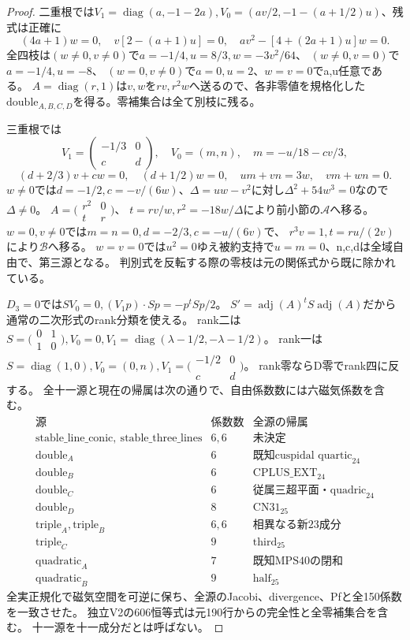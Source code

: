 \documentclass[a4paper,11pt]{ltjsarticle}
\theoremstyle{definition}
\begin{document}
\begin{proof}
二重根では$V_1=\operatorname{diag}(a,-1-2a),V_0=(av/2,-1-(a+1/2)u)$、残式は正確に
\[
 (4a+1)w=0,\quad v[2-(a+1)u]=0,\quad av^2-[4+(2a+1)u]w=0.
\]
全四枝は$(w\ne0,v\ne0)$で$a=-1/4,u=8/3,w=-3v^2/64$、
$(w\ne0,v=0)$で$a=-1/4,u=-8$、
$(w=0,v\ne0)$で$a=0,u=2$、$w=v=0$でa,u任意である。
$A=\operatorname{diag}(r,1)$は$v,w$を$rv,r^2w$へ送るので、各非零値を規格化した
$\mathrm{double}_{A,B,C,D}$を得る。零補集合は全て別枝に残る。

三重根では
\[
 V_1=\begin{pmatrix}-1/3&0\\c&d\end{pmatrix},\quad V_0=(m,n),\quad
 m=-u/18-cv/3,
\]
\[
 (d+2/3)v+cw=0,\quad(d+1/2)w=0,\quad um+vn=3w,\quad vm+wn=0.
\]
$w\ne0$では$d=-1/2,c=-v/(6w)$、$\Delta=uw-v^2$に対し$\Delta^2+54w^3=0$なので$\Delta\ne0$。
$A=\bigl(\begin{smallmatrix}r^2&0\\t&r\end{smallmatrix}\bigr)$、
$t=rv/w,r^2=-18w/\Delta$により前小節の$\mathcal A$へ移る。
$w=0,v\ne0$では$m=n=0,d=-2/3,c=-u/(6v)$で、
$r^3v=1,t=ru/(2v)$により$\mathcal B$へ移る。
$w=v=0$では$u^2=0$ゆえ被約支持で$u=m=0$、n,c,dは全域自由で、第三源となる。
判別式を反転する際の零枝は元の関係式から既に除かれている。

$D_3=0$では$SV_0=0,(V_1p)\cdot Sp=-p^tSp/2$。
$S'=\operatorname{adj}(A)^tS\operatorname{adj}(A)$だから通常の二次形式のrank分類を使える。
rank二は$S=\bigl(\begin{smallmatrix}0&1\\1&0\end{smallmatrix}\bigr),V_0=0,
V_1=\operatorname{diag}(\lambda-1/2,-\lambda-1/2)$。
rank一は$S=\operatorname{diag}(1,0),V_0=(0,n),
V_1=\bigl(\begin{smallmatrix}-1/2&0\\c&d\end{smallmatrix}\bigr)$。
rank零ならD零でrank四に反する。
全十一源と現在の帰属は次の通りで、自由係数数には六磁気係数を含む。
\[
\begin{array}{c|r|c}
 \text{源}&\text{係数数}&\text{全源の帰属}\\\hline
 \mathrm{stable\_line\_conic},\ \mathrm{stable\_three\_lines}&6,6&\text{未決定}\\
 \mathrm{double}_{A}&6&\text{既知cuspidal quartic}_{24}\\
 \mathrm{double}_{B}&6&\mathrm{CPLUS\_EXT}_{24}\\
 \mathrm{double}_{C}&6&\text{従属三超平面・quadric}_{24}\\
 \mathrm{double}_D&8&\mathrm{CN31}_{25}\\
 \mathrm{triple}_A,\mathrm{triple}_B&6,6&\text{相異なる新23成分}\\
 \mathrm{triple}_C&9&\mathrm{third}_{25}\\
 \mathrm{quadratic}_A&7&\text{既知MPS40の閉和}\\
 \mathrm{quadratic}_B&9&\mathrm{half}_{25}
\end{array}
\]
全実正規化で磁気空間を可逆に保ち、全源のJacobi、divergence、Pfと全150係数を一致させた。
独立V2の606恒等式は元190行からの完全性と全零補集合を含む。
十一源を十一成分だとは呼ばない。
\end{proof}
\end{document}
